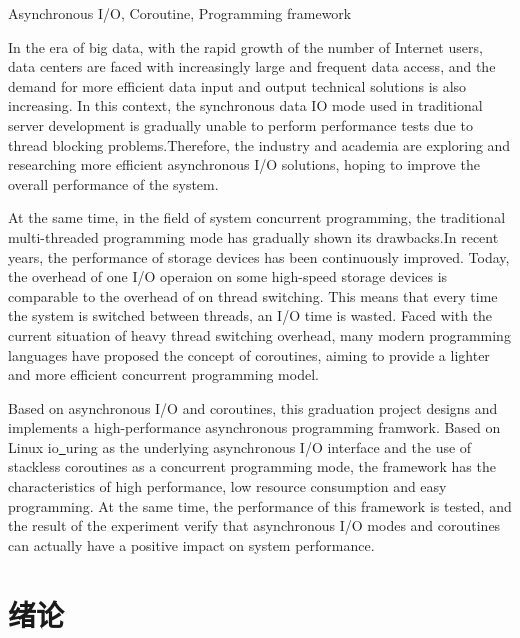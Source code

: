 \documentclass[supercite]{HustGraduPaper}
\theoremstyle{definition}
\begin{document}
\begin{enabstract}{Asynchronous I/O, Coroutine, Programming framework}

In the era of big data, with the rapid growth of the number of Internet users, data centers
are faced with increasingly large and frequent data access, and the demand for more efficient
data input and output technical solutions is also increasing. In this context, the synchronous
data IO mode used in traditional server development is gradually unable to perform performance
tests due to thread blocking problems.Therefore, the industry and academia are exploring and
researching more efficient asynchronous I/O solutions, hoping to improve the overall performance
of the system.\par

At the same time, in the field of system concurrent programming, the traditional multi-threaded
programming mode has gradually shown its drawbacks.In recent years, the performance of storage
devices has been continuously improved. Today, the overhead of one I/O operaion on some high-speed
storage devices is comparable to the overhead of on thread switching. This means that every time
the system is switched between threads, an I/O time is wasted. Faced with the current situation
of heavy thread switching overhead, many modern programming languages have proposed the concept
of coroutines, aiming to provide a lighter and more efficient concurrent programming model.\par

Based on asynchronous I/O and coroutines, this graduation project designs and implements a
high-performance asynchronous programming framwork. Based on Linux io\underline{~}uring as
the underlying asynchronous I/O interface and the use of stackless coroutines as a concurrent
programming mode, the framework has the characteristics of high performance, low resource consumption
and easy programming. At the same time, the performance of this framework is tested, and the
result of the experiment verify that asynchronous I/O modes and coroutines can actually have a
positive impact on system performance.\par

\end{enabstract}

\tableofcontents[level=2]
\clearpage


\section{绪论}
\end{document}
